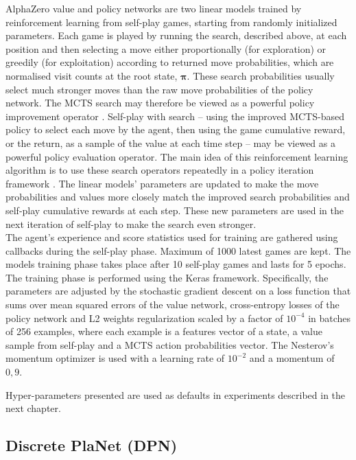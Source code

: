 AlphaZero value and policy networks are two linear models trained by reinforcement learning from self-play games, starting from randomly initialized parameters. Each game is played by running the search, described above, at each position and then selecting a move either proportionally (for exploration) or greedily (for exploitation) according to returned move probabilities, which are normalised visit counts at the root state, $\boldsymbol\pi$. These search probabilities usually select much stronger moves than the raw move probabilities of the policy network. The MCTS search may therefore be viewed as a powerful policy improvement operator \cite{Book.RLAI}. Self-play with search – using the improved MCTS-based policy to select each move by the agent, then using the game cumulative reward, or the return, as a sample of the value at each time step – may be viewed as a powerful policy evaluation operator. The main idea of this reinforcement learning algorithm is to use these search operators repeatedly in a policy iteration framework \cite{Algo.AlphaGoZero}. The linear models' parameters are updated to make the move probabilities and values more closely match the improved search probabilities and self-play cumulative rewards at each step. These new parameters are used in the next iteration of self-play to make the search even stronger. \\
The agent's experience and score statistics used for training are gathered using callbacks during the self-play phase. Maximum of 1000 latest games are kept. The models training phase takes place after 10 self-play games and lasts for 5 epochs. The training phase is performed using the Keras \cite{Code.Keras} framework. Specifically, the parameters are adjusted by the stochastic gradient descent on a loss function that sums over mean squared errors of the value network, cross-entropy losses of the policy network and L2 weights regularization scaled by a factor of $10^{-4}$ in batches of 256 examples, where each example is a features vector of a state, a value sample from self-play and a MCTS action probabilities vector. The Nesterov's momentum optimizer \cite{Algo.Nesterov} is used with a learning rate of $10^{-2}$ and a momentum of $0,9$.

Hyper-parameters presented are used as defaults in experiments described in the next chapter.

\subsection{Discrete PlaNet (DPN)}

